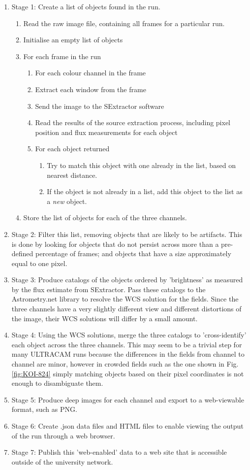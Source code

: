 \documentclass[a4paper,10pt]{article}
\begin{document}
\begin{enumerate}
	\item Stage 1: Create a list of objects found in the run. 
	\begin{enumerate}
		\item Read the raw image file, containing all frames for a particular run.
		\item Initialise an empty list of objects
		\item For each frame in the run
		\begin{enumerate}
			\item For each colour channel in the frame
			\item Extract each window from the frame
			\item Send the image to the SExtractor software
			\item Read the results of the source extraction process, including pixel position and flux measurements for each object
			\item For each object returned
			\begin{enumerate} 
				\item Try to match this object with one already in the list, based on nearest distance.
				\item If the object is not already in a list, add this object to the list as a \emph{new} object.
			\end{enumerate}
		\end{enumerate}
		\item Store the list of objects for each of the three channels.
	\end{enumerate}
	\item Stage 2: Filter this list, removing objects that are likely to be artifacts. This is done by looking for objects that do not persist across more than a pre-defined percentage of frames; and objects that have a size approximately equal to one pixel. 
	\item Stage 3: Produce catalogs of the objects ordered by 'brightness' as measured by the flux estimate from SExtractor. Pass these catalogs to the Astrometry.net library to resolve the WCS solution for the fields. Since the three channels have a very slightly different view and different distortions of the image, their WCS solutions will differ by a small amount.
	\item Stage 4: Using the WCS solutions, merge the three catalogs to 'cross-identify' each object across the three channels. This may seem to be a trivial step for many ULTRACAM runs because the differences in the fields from channel to channel are minor, however in crowded fields such as the one shown in Fig. \ref{fig:KOI-824} simply matching objects based on their pixel coordinates is not enough to disambiguate them.
	\item Stage 5: Produce deep images for each channel and export to a web-viewable format, such as PNG. 
	\item Stage 6: Create .json data files and HTML files to enable viewing the output of the run through a web browser. 
	\item Stage 7: Publish this 'web-enabled' data to a web site that is accessible outside of the university network.  
		

\end{enumerate}
\end{document}
